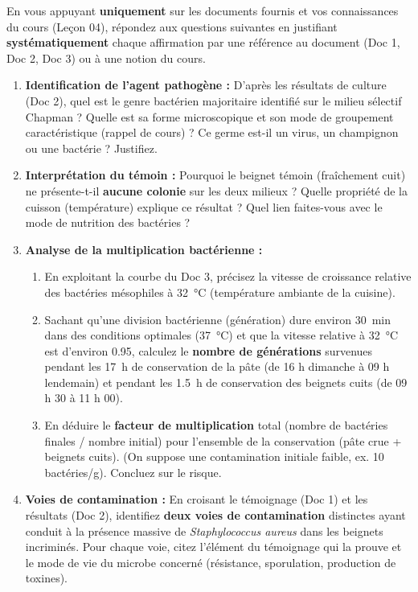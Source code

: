\documentclass[11pt]{article}
\newcommand{\cle}[1]{{\popxbold\color{popdark}#1}}
\newcounter{popsec}
\newcounter{popsub}
\newcommand{\courssub}[1]{%
  \stepcounter{popsub}%
  \par\vspace{9pt}\noindent{\popxbold\fontsize{11.5}{13}\selectfont\color{popink}{\color{poporange}\thepopsec.\thepopsub}\hspace{6pt}#1}\par\nopagebreak\vspace{4pt}
}
\begin{document}
\courssub{Consignes}
En vous appuyant \textbf{uniquement} sur les documents fournis et vos connaissances du cours (Leçon 04), répondez aux questions suivantes en justifiant \textbf{systématiquement} chaque affirmation par une référence au document (Doc 1, Doc 2, Doc 3) ou à une notion du cours.

\begin{enumerate}
    \item \textbf{Identification de l'agent pathogène :} D'après les résultats de culture (Doc 2), quel est le \cle{genre} bactérien majoritaire identifié sur le milieu sélectif Chapman ? Quelle est sa \cle{forme} microscopique et son \cle{mode de groupement} caractéristique (rappel de cours) ? Ce germe est-il un virus, un champignon ou une bactérie ? Justifiez.
    
    \item \textbf{Interprétation du témoin :} Pourquoi le beignet témoin (fraîchement cuit) ne présente-t-il \textbf{aucune colonie} sur les deux milieux ? Quelle propriété de la \cle{cuisson} (température) explique ce résultat ? Quel lien faites-vous avec le mode de nutrition des bactéries ?
    
    \item \textbf{Analyse de la multiplication bactérienne :} 
    \begin{enumerate}
        \item En exploitant la courbe du Doc 3, précisez la \cle{vitesse de croissance relative} des bactéries mésophiles à \SI{32}{\celsius} (température ambiante de la cuisine). 
        \item Sachant qu'une division bactérienne (génération) dure environ \SI{30}{\minute} dans des conditions optimales (\SI{37}{\celsius}) et que la vitesse relative à \SI{32}{\celsius} est d'environ \num{0,95}, calculez le \textbf{nombre de générations} survenues pendant les \SI{17}{\hour} de conservation de la pâte (de 16 h dimanche à 09 h lendemain) et pendant les \SI{1,5}{\hour} de conservation des beignets cuits (de 09 h 30 à 11 h 00). 
        \item En déduire le \textbf{facteur de multiplication} total (nombre de bactéries finales / nombre initial) pour l'ensemble de la conservation (pâte crue + beignets cuits). (On suppose une contamination initiale faible, ex. \num{10} bactéries/g). Concluez sur le risque.
    \end{enumerate}
    
    \item \textbf{Voies de contamination :} En croisant le témoignage (Doc 1) et les résultats (Doc 2), identifiez \textbf{deux voies de contamination} distinctes ayant conduit à la présence massive de \textit{Staphylococcus aureus} dans les beignets incriminés. Pour chaque voie, citez l'élément du témoignage qui la prouve et le \cle{mode de vie} du microbe concerné (résistance, sporulation, production de toxines).
    

\end{enumerate}
\end{document}
